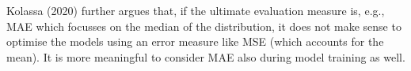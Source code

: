 \documentclass[
]{article}
\begin{document}
Kolassa (2020) further argues that, if the ultimate evaluation measure
is, e.g., MAE which focusses on the median of the distribution, it does
not make sense to optimise the models using an error measure like MSE
(which accounts for the mean). It is more meaningful to consider MAE
also during model training as well.
\end{document}
